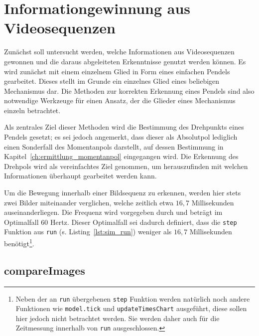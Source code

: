 
\chapter{Informationgewinnung aus Videosequenzen}\label{ch:infoerhalt_aus_abgleich_bilder}


Zunächst soll untersucht werden, welche Informationen aus Videosequenzen gewonnen und die daraus abgeleiteten Erkenntnisse genutzt werden können.
Es wird zunächst mit einem einzelnem Glied in Form eines einfachen Pendels gearbeitet.
Dieses stellt im Grunde ein einzelnes Glied eines beliebigen Mechanismus dar.
Die Methoden zur korrekten Erkennung eines Pendels sind also notwendige Werkzeuge für einen Ansatz, der die Glieder eines Mechanismus einzeln betrachtet.

Als zentrales Ziel dieser Methoden wird die Bestimmung des Drehpunkts eines Pendels gesetzt; es sei jedoch angemerkt, dass dieser als Absolutpol lediglich einen Sonderfall des Momentanpols darstellt, auf dessen Bestimmung in Kapitel~\ref{ch:ermittlung_momentanpol} eingegangen wird.
Die Erkennung des Drehpols wird als vereinfachtes Ziel genommen, um herauszufinden mit welchen Informationen überhaupt gearbeitet werden kann.

Um die Bewegung innerhalb einer Bildsequenz zu erkennen, werden hier stets zwei Bilder miteinander verglichen, welche zeitlich etwa $16,7$ Millisekunden auseinanderliegen.
Die Frequenz wird vorgegeben durch  und beträgt im Optimalfall 60 Hertz.
Dieser Optimalfall sei dadurch definiert, dass die \lstinline{step} Funktion aus \lstinline{run} (s. Listing~\ref{lst:sim_run}) weniger als $16,7$ Millisekunden benötigt\footnote{Neben der an \lstinline{run} übergebenen \lstinline{step} Funktion werden natürlich noch andere Funktionen wie \lstinline{model.tick} und \lstinline{updateTimesChart} ausgeführt, diese sollen hier jedoch nicht betrachtet werden. Sie werden daher auch für die Zeitmessung innerhalb von \lstinline{run} ausgeschlossen.}.

\section{compareImages}

